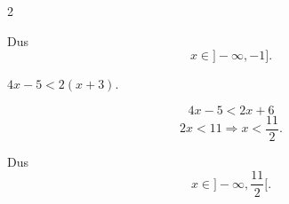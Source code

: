 \documentclass{ximera}
\begin{document}
\begin{oefening}[Eerstegraadsongelijkheden]{\oefB\ESS}
\begin{multicols}{2}
\begin{question}
\begin{oplossing}
Dus
\[
x\in]-\infty,-1].
\]
\end{oplossing}
\end{question}


\begin{question}
$4x-5<2(x+3)$.

\begin{oplossing}
\[
4x-5<2x+6
\]
\[
2x<11
\Rightarrow
x<\frac{11}{2}.
\]

Dus
\[
x\in]-\infty,\frac{11}{2}[.
\]
\end{oplossing}
\end{question}

\end{multicols}

\end{oefening}

\end{document}
